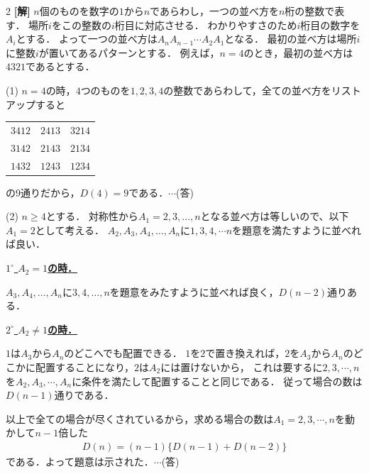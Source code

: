 \documentclass[../../main.tex]{subfiles}
\begin{document}
\setcounter{equation}{0}
\setcounter{figure}{0}
\setcounter{table}{0}
\begin{oframed}
  
\end{oframed}
\setlength{\columnseprule}{0.4pt}
\begin{multicols}{2}
  {\bf[解]}
  $n$個のものを数字の$1$から$n$であらわし，一つの並べ方を$n$桁の整数で表す．
  場所$i$をこの整数の$i$桁目に対応させる．
  わかりやすさのため$i$桁目の数字を$A_i$とする．
  よって一つの並べ方は$A_nA_{n-1}\cdots A_{2}A_{1}$となる．
  最初の並べ方は場所$i$に整数$i$が置いてあるパターンとする．
  例えば，$n=4$のとき，最初の並べ方は$4321$であるとする．

  \vspace{10pt}
  (1)
  $n=4$の時，$4$つのものを$1,2,3,4$の整数であらわして，全ての並べ方をリストアップすると
  \begin{table}[H]
    \centering
    \begin{tabular}{ccc}
      $3412$ & $2413$ & $3214$ \\
      $3142$ & $2143$ & $2134$ \\
      $1432$ & $1243$ & $1234$ \\
    \end{tabular}
  \end{table}
  の$9$通りだから，$D(4)=9$である．$\cdots$(答)

  \vspace{10pt}
  (2)
  $n\ge 4$とする．
  対称性から$A_1=2,3,\dots,n$となる並べ方は等しいので、以下$A_1=2$として考える．
  $A_2,A_3, A_4, \dots, A_n$に$1,3,4,\cdots n$を題意を満たすように並べれば良い．

  \vspace{5pt}
  \underline{\textbf{$1^{\circ}$ $A_2=1$の時．}}

  $A_3, A_4, \dots, A_n$に$3,4,\dots,n$を題意をみたすように並べれば良く，$D(n-2)$通りある．

  \vspace{5pt}
  \underline{\textbf{$2^{\circ}$ $A_2\neq 1$の時．}}

  $1$は$A_3$から$A_n$のどこへでも配置できる．
  $1$を$2$で置き換えれば，$2$を$A_3$から$A_n$のどこかに配置することになり，$2$は$A_2$には置けないから，
  これは要するに$2,3,\cdots,n$を$A_2,A_3,\cdots, A_n$に条件を満たして配置することと同じである．
  従って場合の数は$D(n-1)$通りである．

  \vspace{5pt}
  以上で全ての場合が尽くされているから，求める場合の数は$A_1=2,3,\cdots, n$を動かして$n-1$倍した
  \begin{align*}
    D(n) = (n-1) \{ D(n-1) + D(n-2) \}
  \end{align*}
  である．よって題意は示された．$\cdots$(答)


\end{multicols}
\end{document}

